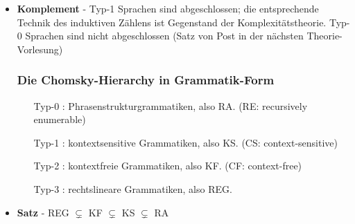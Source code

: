 \documentclass[12pt, a4paper]{article}
\begin{document}
\begin{itemize}
		\item \textbf{Komplement} - Typ-1 Sprachen sind abgeschlossen; die entsprechende Technik des induktiven Zählens ist Gegenstand der Komplexitätstheorie.
			\subitem Typ-0 Sprachen sind nicht abgeschlossen (Satz von Post in der nächsten Theorie-Vorlesung)
			
		\subsubsection{Die Chomsky-Hierarchy in Grammatik-Form}
		\begin{itemize}
			\item[Typ-0]: Phrasenstrukturgrammatiken, also RA. (RE: recursively enumerable)
			\item[Typ-1]: kontextsensitive Grammatiken, also KS. (CS: context-sensitive)
			\item[Typ-2]: kontextfreie Grammatiken, also KF. (CF: context-free)
			\item[Typ-3]: rechtslineare Grammatiken, also REG.
		\end{itemize}
	
		\item \textbf{Satz} - REG $\subsetneq$ KF $\subsetneq$ KS $\subsetneq$ RA
				
	\end{itemize}
\end{document}
